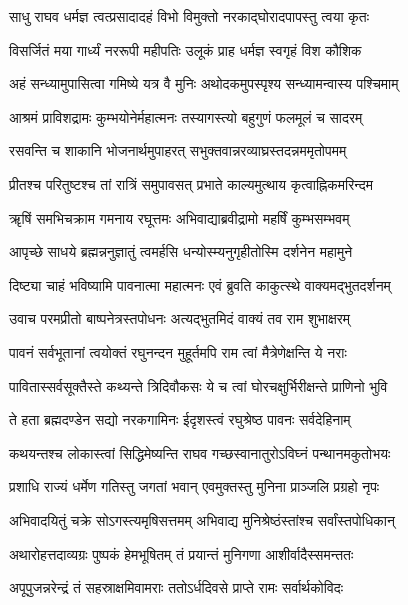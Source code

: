 \twolineshloka
{साधु राघव धर्मज्ञ त्वत्प्रसादादहं विभो}
{विमुक्तो नरकाद्घोरादपापस्तु त्वया कृतः}%

\twolineshloka
{विसर्जितं मया गार्ध्यं नररूपी महीपतिः}
{उलूकं प्राह धर्मज्ञ स्वगृहं विश कौशिक}%

\twolineshloka
{अहं सन्ध्यामुपासित्वा गमिष्ये यत्र वै मुनिः}
{अथोदकमुपस्पृश्य सन्ध्यामन्वास्य पश्चिमाम्}%

\twolineshloka
{आश्रमं प्राविशद्रामः कुम्भयोनेर्महात्मनः}
{तस्यागस्त्यो बहुगुणं फलमूलं च सादरम्}%

\twolineshloka
{रसवन्ति च शाकानि भोजनार्थमुपाहरत्}
{सभुक्तवान्नरव्याघ्रस्तदन्नममृतोपमम्}%

\twolineshloka
{प्रीतश्च परितुष्टश्च तां रात्रिं समुपावसत्}
{प्रभाते काल्यमुत्थाय कृत्वाह्निकमरिन्दम}%

\twolineshloka
{ॠषिं समभिचक्राम गमनाय रघूत्तमः}
{अभिवाद्याब्रवीद्रामो महर्षिं कुम्भसम्भवम्}%

\twolineshloka
{आपृच्छे साधये ब्रह्मन्ननुज्ञातुं त्वमर्हसि}
{धन्योस्म्यनुगृहीतोस्मि दर्शनेन महामुने}%

\twolineshloka
{दिष्ट्या चाहं भविष्यामि पावनात्मा महात्मनः}
{एवं ब्रुवति काकुत्स्थे वाक्यमद्भुतदर्शनम्}%

\twolineshloka
{उवाच परमप्रीतो बाष्पनेत्रस्तपोधनः}
{अत्यद्भुतमिदं वाक्यं तव राम शुभाक्षरम्}%

\twolineshloka
{पावनं सर्वभूतानां त्वयोक्तं रघुनन्दन}
{मुहूर्तमपि राम त्वां मैत्रेणेक्षन्ति ये नराः}%

\twolineshloka
{पावितास्सर्वसूक्तैस्ते कथ्यन्ते त्रिदिवौकसः}
{ये च त्वां घोरचक्षुर्भिरीक्षन्ते प्राणिनो भुवि}%

\twolineshloka
{ते हता ब्रह्मदण्डेन सद्यो नरकगामिनः}
{ईदृशस्त्वं रघुश्रेष्ठ पावनः सर्वदेहिनाम्}%

\twolineshloka
{कथयन्तश्च लोकास्त्वां सिद्धिमेष्यन्ति राघव}
{गच्छस्वानातुरोऽविघ्नं पन्थानमकुतोभयः}%

\twolineshloka
{प्रशाधि राज्यं धर्मेण गतिस्तु जगतां भवान्}
{एवमुक्तस्तु मुनिना प्राञ्जलि प्रग्रहो नृपः}%

\twolineshloka
{अभिवादयितुं चक्रे सोऽगस्त्यमृषिसत्तमम्}
{अभिवाद्य मुनिश्रेष्ठंस्तांश्च सर्वांस्तपोधिकान्}%

\twolineshloka
{अथारोहत्तदाव्यग्रः पुष्पकं हेमभूषितम्}
{तं प्रयान्तं मुनिगणा आशीर्वादैस्समन्ततः}%

\twolineshloka
{अपूपुजन्नरेन्द्रं तं सहस्राक्षमिवामराः}
{ततोऽर्धदिवसे प्राप्ते रामः सर्वार्थकोविदः}%

